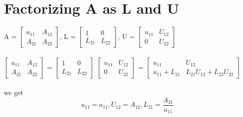 \documentclass[a4paper,oneside]{book}
\begin{document}
 \section{Factorizing A as L and U}
 A = $\begin{bmatrix}
 a_{11} & A_{12} \\
 A_{21} & A_{22}
 \end{bmatrix}$, L = $\begin{bmatrix}
  1 & 0 \\
  L_{21} & L_{22}
  \end{bmatrix}$,  U = $\begin{bmatrix}
    u_{11} & U_{12} \\
    0 & U_{22}
    \end{bmatrix}$
    \\ \\
$\begin{bmatrix}
 a_{11} & A_{12} \\
 A_{21} & A_{22}
 \end{bmatrix}$ =  $\begin{bmatrix}
   1 & 0 \\
   L_{21} & L_{22}
   \end{bmatrix}$ $\begin{bmatrix}
       u_{11} & U_{12} \\
       0 & U_{22}
       \end{bmatrix}$ = $\begin{bmatrix}
              u_{11} & U_{12} \\
              u_{11}+L_{21} & L_{21}U_{12} + L_{22}U_{22}
              \end{bmatrix}$
              \\ \\
we get $$u_{11} = a_{11}, U_{12} = A_{12}, L_{21} = \frac{A_{21}}{a_{11}} $$
\end{document}
